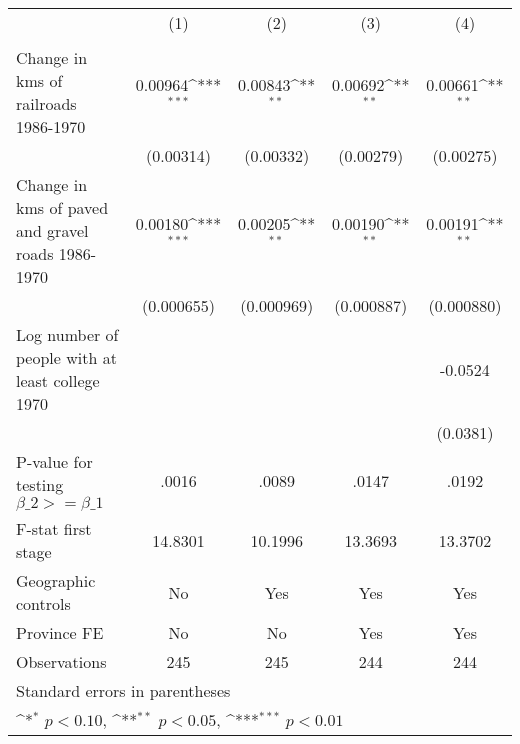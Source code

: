 {
\def\sym#1{\ifmmode^{#1}\else\(^{#1}\)\fi}
\begin{tabular}{l*{4}{c}}
\hline\hline
                &\multicolumn{1}{c}{(1)}&\multicolumn{1}{c}{(2)}&\multicolumn{1}{c}{(3)}&\multicolumn{1}{c}{(4)}\\
                &\multicolumn{1}{c}{}&\multicolumn{1}{c}{}&\multicolumn{1}{c}{}&\multicolumn{1}{c}{}\\
\hline
Change in kms of railroads 1986-1970&  0.00964\sym{***}&  0.00843\sym{**} &  0.00692\sym{**} &  0.00661\sym{**} \\
                &(0.00314)         &(0.00332)         &(0.00279)         &(0.00275)         \\
[1em]
Change in kms of paved and gravel roads 1986-1970&  0.00180\sym{***}&  0.00205\sym{**} &  0.00190\sym{**} &  0.00191\sym{**} \\
                &(0.000655)         &(0.000969)         &(0.000887)         &(0.000880)         \\
[1em]
Log number of people with at least college 1970&                  &                  &                  &  -0.0524         \\
                &                  &                  &                  & (0.0381)         \\
\hline
P-value for testing $\beta\_{2} >= \beta\_{1}$&    .0016         &    .0089         &    .0147         &    .0192         \\
F-stat first stage&  14.8301         &  10.1996         &  13.3693         &  13.3702         \\
Geographic controls&       No         &      Yes         &      Yes         &      Yes         \\
Province FE     &       No         &       No         &      Yes         &      Yes         \\
Observations    &      245         &      245         &      244         &      244         \\
\hline\hline
\multicolumn{5}{l}{\footnotesize Standard errors in parentheses}\\
\multicolumn{5}{l}{\footnotesize \sym{*} \(p<0.10\), \sym{**} \(p<0.05\), \sym{***} \(p<0.01\)}\\
\end{tabular}
}
